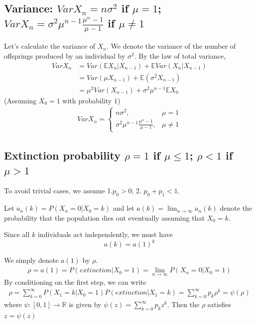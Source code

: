 \documentclass[11pt]{elegantbook}
\begin{document}
\subsection{Variance: $Var X_n=n\sigma^2$ if $\mu=1$; $Var X_n=\sigma^2\mu^{n-1}\frac{\mu^n-1}{\mu-1}$ if $\mu\neq 1$}
Let's calculate the variance of $X_n$. We denote the variance of the number of offsprings produced by an individual by $\sigma^2$. By the law of total variance,
\begin{equation}
    \begin{aligned}
        Var X_n&=Var(\mathbb{E} X_n|X_{n-1})+\mathbb{E}Var(X_n|X_{n-1})\\&=Var(\mu X_{n-1})+ \mathbb{E}(\sigma^2 X_{n-1})\\&=\mu^2 Var(X_{n-1})+\sigma^2 \mu^{n-1}\mathbb{E}X_0
    \end{aligned}
    \nonumber
\end{equation}
(Assuming $X_0=1$ with probability $1$)
\begin{equation}
    \begin{aligned}
        Var X_n=\left\{\begin{matrix}
            n\sigma^2,&\mu=1\\
            \sigma^2\mu^{n-1}\frac{\mu^n-1}{\mu-1},&\mu\neq 1
        \end{matrix}\right.
    \end{aligned}
    \nonumber
\end{equation}



\subsection{Extinction probability $\rho=1$ if $\mu\leq 1$; $\rho<1$ if $\mu>1$}

To avoid trivial cases, we assume 1.$p_0>0$; 2. $p_0+p_1<1$.

Let $a_n(k)=P(X_n=0|X_0=k)$ and let $a(k)=\lim_{n \rightarrow \infty}a_n(k)$ denote the probability that the population dies out eventually assuming that $X_0=k$.

Since all $k$ individuals act independently, we must have $$a(k)=a(1)^k$$

We simply denote $a(1)$ by $\rho$.
\begin{equation}
    \begin{aligned}
        \rho=a(1)=P(extinction|X_0=1)=\lim_{n \rightarrow \infty}P(X_n=0|X_0=1)
    \end{aligned}
    \nonumber
\end{equation}
By conditioning on the first step, we can write
\begin{equation}
    \begin{aligned}
        \rho=\sum_{k=0}^\infty P(X_1=k|X_0=1)P(extinction|X_1=k)=\sum_{k=0}^\infty p_k\rho^k=\psi(\rho)
    \end{aligned}
    \nonumber
\end{equation}
where $\psi:[0,1] \rightarrow \mathbb{R}$ is given by $\psi(z)=\sum_{k=0}^\infty p_k z^k$. Then the $\rho$ satisfies $z=\psi(z)$
\end{document}
